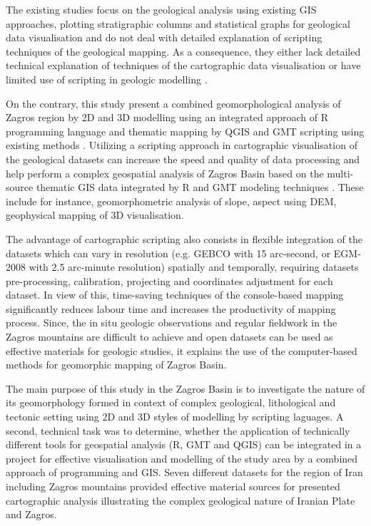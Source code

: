 \documentclass[12pt,a4paper,oneside]{article}
\def \newpar{\vspace{6pt}}
\begin{document}
\newpar The existing studies focus on the geological analysis using existing GIS approaches, plotting stratigraphic columns and statistical graphs for geological data visualisation \citep{Mouthereau,Koshnaw,Suetova} and do not deal with detailed explanation of scripting techniques of the geological mapping. As a consequence, they either lack detailed technical explanation of techniques of the cartographic data visualisation \citep{Tavani} or have limited use of scripting in geologic modelling \citep{Lemenkov2021}. 

\newpar On the contrary, this study present a combined geomorphological analysis of Zagros region by 2D and 3D modelling using an integrated approach of R programming language and thematic mapping by QGIS and GMT scripting using existing methods \cite{Lemenkova202203}. Utilizing a scripting approach in cartographic visualisation of the geological datasets can increase the speed and quality of data processing and help perform a complex geospatial analysis of Zagros Basin based on the multi-source thematic GIS data integrated by R and GMT modeling techniques \citep{Lemenkova2019a}. These include for instance, geomorphometric analysis of slope, aspect using DEM, geophysical mapping of 3D visualisation. 

\newpar The advantage of cartographic scripting also consists in flexible integration of the datasets which can vary in resolution (e.g. GEBCO with 15 arc-second, or EGM-2008 with 2.5 arc-minute resolution) spatially and temporally, requiring datasets pre-processing, calibration, projecting and coordinates adjustment for each dataset. In view of this, time-saving techniques of the console-based mapping significantly reduces labour time and increases the productivity of mapping process.  Since, the in situ geologic observations and regular fieldwork in the Zagros mountains are difficult to achieve and open datasets can be used as effective materials for geologic studies, it explains the use of the computer-based methods for geomorphic mapping of Zagros Basin. 

\newpar The main purpose of this study in the Zagros Basin is to investigate the nature of its geomorphology formed in context of complex geological, lithological and tectonic setting using 2D and 3D styles of modelling by scripting laguages. A second, technical task was to determine, whether the application of technically different tools for geospatial analysis (R, GMT and QGIS) can be integrated in a project for effective visualisation and modelling of the study area by a combined approach of programming and GIS. Seven different datasets for the region of Iran including Zagros mountains provided effective material sources for presented cartographic analysis illustrating the complex geological nature of Iranian Plate and Zagros. 
\end{document}
